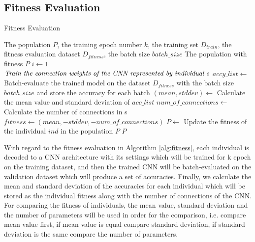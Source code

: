 \documentclass[conference]{IEEEtran}
\begin{document}
\subsection{Fitness Evaluation}
\begin{algorithm}
	\caption{Fitness Evaluation}
	\label{alg:fitness}
	\begin{algorithmic}
		\renewcommand{\algorithmicrequire}{\textbf{Input:}}
		\renewcommand{\algorithmicensure}{\textbf{Output:}}
		\REQUIRE The population $P$, the training epoch number $k$, the training set $D_{train}$, the fitness evaluation dataset $D_{fitness}$, the batch size $batch\_size$
		\ENSURE The population with fitness $P$
			\STATE $i \leftarrow 1$
				\STATE $\textit{Train the connection weights of the CNN } \newline \textit{represented by individual s}$
			\ENDWHILE
			\STATE $accy\_list \leftarrow$ Batch-evaluate the trained model on the dataset $D_{fitness}$ with the batch size $batch\_size$ and store the accuracy for each batch
			\STATE $(mean, stddev) \leftarrow$ Calculate the mean value and standard deviation of  $acc\_list$
			\STATE $num\_of\_connections \leftarrow$ Calculate the number of connections in s
			\STATE $fitness \leftarrow (mean, -stddev, -num\_of\_connections)$
			\STATE $P \leftarrow$ Update the fitness of the individual $ind$ in the population $P$
		\ENDFOR	
		\RETURN $P$	
	\end{algorithmic}
\end{algorithm}

With regard to the fitness evaluation in Algorithm \ref{alg:fitness}, each individual is decoded to a CNN architecture with its settings which will be trained for k epoch on the training dataset, and then the trained CNN will be batch-evaluated on the validation dataset which will produce a set of accuracies. Finally, we calculate the mean and standard deviation of the accuracies for each individual which will be stored as the individual fitness along with the number of connections of the CNN. 
For comparing the fitness of individuals, the mean value, standard deviation and the number of parameters will be used in order for the comparison, i.e. compare mean value first, if mean value is equal compare standard deviation, if standard deviation is the same compare the number of parameters.
\end{document}
